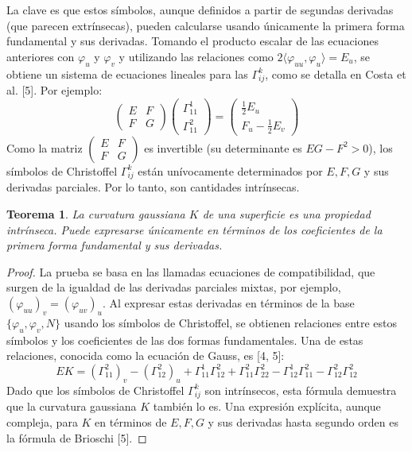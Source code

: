 \documentclass[12pt, a4paper]{report}
\theoremstyle{miestilo}
\newtheorem{teorema}{Teorema}[chapter]
\theoremstyle{midefinicion}
\begin{document}
La clave es que estos símbolos, aunque definidos a partir de segundas derivadas (que parecen extrínsecas), pueden calcularse usando únicamente la primera forma fundamental y sus derivadas. Tomando el producto escalar de las ecuaciones anteriores con $\varphi_u$ y $\varphi_v$ y utilizando las relaciones como $2\langle \varphi_{uu}, \varphi_u \rangle = E_u$, se obtiene un sistema de ecuaciones lineales para las $\Gamma_{ij}^k$, como se detalla en Costa et al. [5]. Por ejemplo:
$$ \begin{pmatrix} E & F \\ F & G \end{pmatrix} \begin{pmatrix} \Gamma_{11}^1 \\ \Gamma_{11}^2 \end{pmatrix} = \begin{pmatrix} \frac{1}{2}E_u \\ F_u - \frac{1}{2}E_v \end{pmatrix} $$
Como la matriz $\begin{pmatrix} E & F \\ F & G \end{pmatrix}$ es invertible (su determinante es $EG-F^2 > 0$), los símbolos de Christoffel $\Gamma_{ij}^k$ están unívocamente determinados por $E, F, G$ y sus derivadas parciales. Por lo tanto, son cantidades intrínsecas.

\begin{teorema}
La curvatura gaussiana $K$ de una superficie es una propiedad intrínseca. Puede expresarse únicamente en términos de los coeficientes de la primera forma fundamental y sus derivadas.
\end{teorema}

\begin{proof}
La prueba se basa en las llamadas ecuaciones de compatibilidad, que surgen de la igualdad de las derivadas parciales mixtas, por ejemplo, $(\varphi_{uu})_v = (\varphi_{uv})_u$. Al expresar estas derivadas en términos de la base $\{\varphi_u, \varphi_v, N\}$ usando los símbolos de Christoffel, se obtienen relaciones entre estos símbolos y los coeficientes de las dos formas fundamentales. Una de estas relaciones, conocida como la ecuación de Gauss, es [4, 5]:
$$ E K = (\Gamma_{11}^2)_v - (\Gamma_{12}^2)_u + \Gamma_{11}^1 \Gamma_{12}^2 + \Gamma_{11}^2 \Gamma_{22}^2 - \Gamma_{12}^1 \Gamma_{11}^2 - \Gamma_{12}^2 \Gamma_{12}^2 $$
Dado que los símbolos de Christoffel $\Gamma_{ij}^k$ son intrínsecos, esta fórmula demuestra que la curvatura gaussiana $K$ también lo es. Una expresión explícita, aunque compleja, para $K$ en términos de $E, F, G$ y sus derivadas hasta segundo orden es la fórmula de Brioschi [5].
\end{proof}
\end{document}
